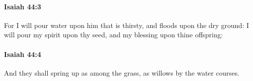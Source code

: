 		\paragraph{Isaiah 44:3} %
			\label{ISAIAH-44-3}

			For I will pour water upon him that is thirsty, and floods upon the dry ground: I will pour my spirit upon thy seed, and my blessing upon thine offspring:


		\paragraph{Isaiah 44:4} %
			\label{ISAIAH-44-4}

			And they shall spring up as among the grass, as willows by the water courses.


